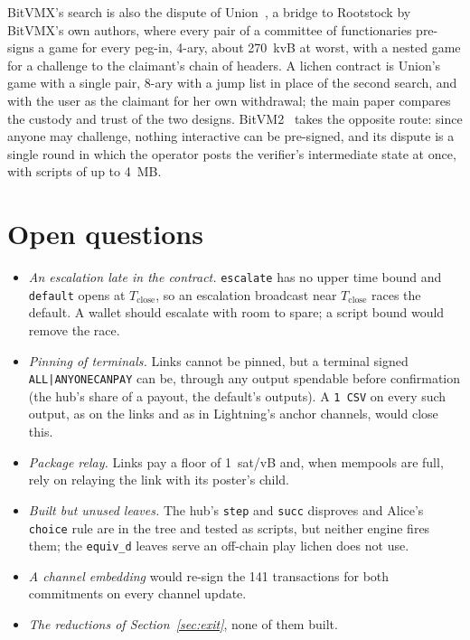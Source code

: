 \documentclass[11pt]{article}
\newcommand{\Tc}{T_{\mathrm{close}}}
\newcommand{\tx}[1]{\texttt{#1}}
\begin{document}
BitVMX's search is also the dispute of Union~\cite{union}, a bridge to
Rootstock by BitVMX's own authors, where every pair of a committee of
functionaries pre-signs a game for every peg-in, 4-ary, about 270~kvB at
worst, with a nested game for a challenge to the claimant's chain of
headers. A lichen contract is Union's game with a single pair, 8-ary
with a jump list in place of the second search, and with the user as the
claimant for her own withdrawal; the main paper compares the custody
and trust of the two designs. BitVM2~\cite{bitvm2usenix} takes the
opposite route: since anyone may challenge, nothing interactive can be
pre-signed, and its dispute is a single round in which the operator
posts the verifier's intermediate state at once, with scripts of up to
4~MB.

\section{Open questions}
\label{sec:open}

\begin{itemize}[leftmargin=1.5em]
\item \emph{An escalation late in the contract.} \tx{escalate} has no
  upper time bound and \tx{default} opens at $\Tc$, so an escalation
  broadcast near $\Tc$ races the default. A wallet should escalate with
  room to spare; a script bound would remove the race.
\item \emph{Pinning of terminals.} Links cannot be pinned, but a
  terminal signed \texttt{ALL|ANYONECANPAY} can be, through any output
  spendable before confirmation (the hub's share of a payout, the
  default's outputs). A \texttt{1 CSV} on every such output, as on the
  links and as in Lightning's anchor channels, would close this.
\item \emph{Package relay.} Links pay a floor of 1~sat/vB and, when
  mempools are full, rely on relaying the link with its poster's child.
\item \emph{Built but unused leaves.} The hub's \tx{step} and \tx{succ}
  disproves and Alice's \tx{choice} rule are in the tree and tested as
  scripts, but neither engine fires them; the \tx{equiv\_d} leaves serve
  an off-chain play lichen does not use.
\item \emph{A channel embedding} would re-sign the 141 transactions for
  both commitments on every channel update.
\item \emph{The reductions of Section~\ref{sec:exit}}, none of them
  built.
\end{itemize}
\end{document}

